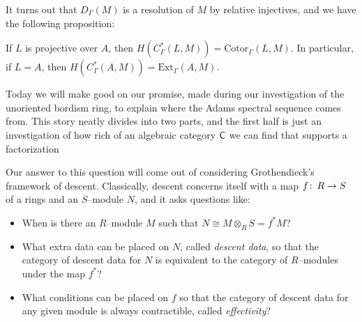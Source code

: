 It turns out that $ D_{\Gamma}(M)$ is a resolution of $ M$ by relative injectives, and we have the following proposition:

\begin{proposition}
If $ L$ is projective over $ A$, then $ H(C_{\Gamma}^*(L, M)) = \text{Cotor}_{\Gamma}(L, M)$.  In particular, if $ L = A$, then $ H(C_{\Gamma}^*(A, M)) = \text{Ext}_{\Gamma}(A, M)$.
\end{proposition}

Today we will make good on our promise, made during our investigation of the unoriented bordism ring, to explain where the Adams spectral sequence comes from.  This story neatly divides into two parts, and the first half is just an investigation of how rich of an algebraic category $\mathsf{C}$ we can find that supports a factorization
\begin{center}
\end{center}
Our answer to this question will come out of considering Grothendieck's framework of descent.  Classically, descent concerns itself with a map $f\colon\thinspace R \to S$ of a rings and an $S$--module $N$, and it asks questions like:
\begin{itemize}
\item When is there an $R$--module $M$ such that $N \cong M \otimes_R S = f^* M$?
\item What extra data can be placed on $N$, called \textit{descent data}, so that the category of descent data for $N$ is equivalent to the category of $R$--modules under the map $f^*$?
\item What conditions can be placed on $f$ so that the category of descent data for any given module is always contractible, called \textit{effectivity}?
\end{itemize}

